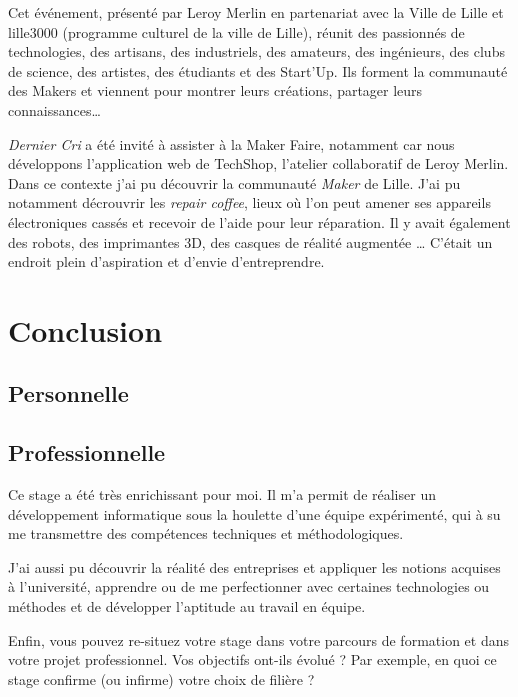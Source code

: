 \bigskip

Cet événement, présenté par Leroy Merlin en partenariat avec la Ville de
Lille et lille3000 (programme culturel de la ville de Lille), réunit des
passionnés de technologies, des artisans, des industriels, des amateurs,
des ingénieurs, des clubs de science, des artistes, des étudiants et des
Start'Up. Ils forment la communauté des Makers et viennent pour montrer
leurs créations, partager leurs connaissances\ldots{}

\bigskip

\emph{Dernier Cri} a été invité à assister à la Maker Faire, notamment
car nous développons l'application web de TechShop, l'atelier
collaboratif de Leroy Merlin. Dans ce contexte j'ai pu découvrir la
communauté \emph{Maker} de Lille. J'ai pu notamment décrouvrir les
\emph{repair coffee}, lieux où l'on peut amener ses appareils
électroniques cassés et recevoir de l'aide pour leur réparation. Il y
avait également des robots, des imprimantes 3D, des casques de réalité
augmentée \ldots{} C'était un endroit plein d'aspiration et d'envie
d'entreprendre.

\newpage

\section{Conclusion}\label{conclusion-2}

\subsection{Personnelle}\label{personnelle}

\subsection{Professionnelle}\label{professionnelle}

Ce stage a été très enrichissant pour moi. Il m'a permit de réaliser un
développement informatique sous la houlette d'une équipe expérimenté,
qui à su me transmettre des compétences techniques et méthodologiques.

J'ai aussi pu découvrir la réalité des entreprises et appliquer les
notions acquises à l'université, apprendre ou de me perfectionner avec
certaines technologies ou méthodes et de développer l'aptitude au
travail en équipe.

Enfin, vous pouvez re-situez votre stage dans votre parcours de
formation et dans votre projet professionnel. Vos objectifs ont-ils
évolué ? Par exemple, en quoi ce stage confirme (ou infirme) votre choix
de filière ?

